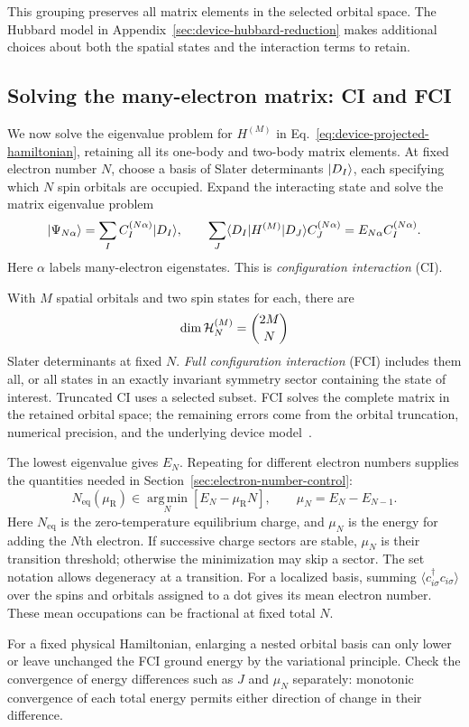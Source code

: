 This grouping preserves all matrix elements in the selected orbital
space. The Hubbard model in Appendix~\ref{sec:device-hubbard-reduction}
makes additional choices about both the spatial states and the
interaction terms to retain.

\subsection{Solving the many-electron matrix: CI and FCI}
\label{sec:device-ci-fci}

We now solve the eigenvalue problem for $H^{(M)}$ in
Eq.~\eqref{eq:device-projected-hamiltonian}, retaining all its
one-body and two-body matrix elements. At fixed electron number
$N$, choose a basis of Slater determinants $\lvert D_I\rangle$, each
specifying which $N$ spin orbitals are occupied. Expand the
interacting state and solve the matrix eigenvalue problem
\begin{equation}
 \ket{\Psi_{N\alpha}}=\sum_I C_I^{(N\alpha)}\ket{D_I},
 \qquad
 \sum_J\bra{D_I}H^{(M)}\ket{D_J}C_J^{(N\alpha)}
       =E_{N\alpha}C_I^{(N\alpha)}.
 \label{eq:device-ci-eigenproblem}
\end{equation}
Here $\alpha$ labels many-electron eigenstates. This is
\emph{configuration interaction} (CI).

With $M$ spatial orbitals and two spin states for each, there are
\begin{equation}
 \dim\Hilb_N^{(M)}=\binom{2M}{N}
 \label{eq:device-fci-dimension}
\end{equation}
Slater determinants at fixed $N$. \emph{Full configuration
interaction} (FCI) includes them all, or all states in an exactly
invariant symmetry sector containing the state of interest.
Truncated CI uses a selected subset. FCI solves the complete
matrix in the retained orbital space; the remaining errors come
from the orbital truncation, numerical precision, and the
underlying device model~\cite{QTCADManyBody}.

The lowest eigenvalue gives $E_N$. Repeating for different
electron numbers supplies the quantities needed in Section~\ref{sec:electron-number-control}:
\begin{equation}
 N_{\mathrm{eq}}(\mu_{\mathrm R})
   \in\operatorname*{arg\,min}_{N}
          [E_N-\mu_{\mathrm R}N],
 \qquad
 \mu_N=E_N-E_{N-1}.
 \label{eq:device-many-body-charge}
\end{equation}
Here $N_{\mathrm{eq}}$ is the zero-temperature equilibrium charge,
and $\mu_N$ is the energy for adding the $N$th electron.
If successive charge sectors are stable, $\mu_N$ is their
transition threshold; otherwise the minimization may skip a sector.
The set notation allows degeneracy at a transition.
For a localized basis, summing
$\langle c_{i\sigma}^\dagger c_{i\sigma}\rangle$ over the spins
and orbitals assigned to a dot gives its mean electron number.
These mean occupations can be fractional at fixed total $N$.

For a fixed physical Hamiltonian, enlarging a nested orbital
basis can only lower or leave unchanged the FCI ground energy
by the variational principle. Check the convergence of energy
differences such as $J$ and $\mu_N$ separately: monotonic
convergence of each total energy permits either direction of
change in their difference.
